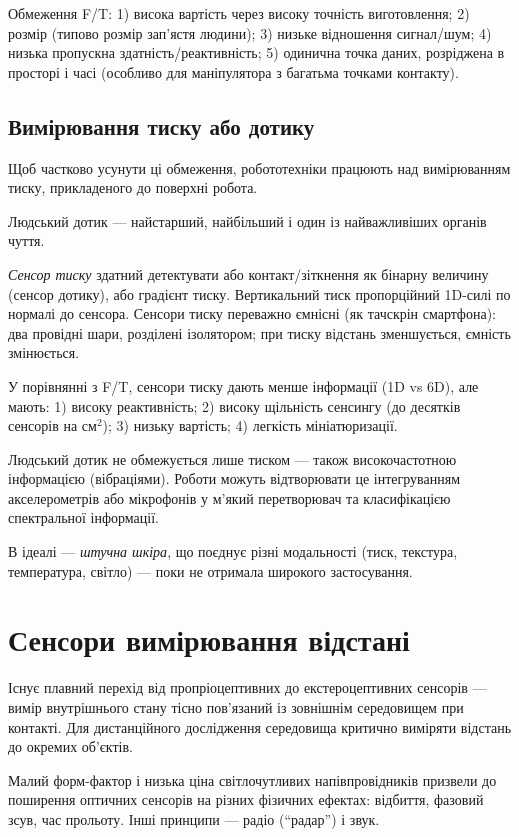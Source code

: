 Обмеження F/T: 1) висока вартість через високу точність виготовлення; 2) розмір (типово розмір зап'ястя людини); 3) низьке відношення сигнал/шум; 4) низька пропускна здатність/реактивність; 5) одинична точка даних, розріджена в просторі і часі (особливо для маніпулятора з багатьма точками контакту).

\subsection{Вимірювання тиску або дотику}
Щоб частково усунути ці обмеження, робототехніки працюють над вимірюванням тиску, прикладеного до поверхні робота.

Людський дотик — найстарший, найбільший і один із найважливіших органів чуття.

\emph{Сенсор тиску} здатний детектувати або контакт/зіткнення як бінарну величину (сенсор дотику), або градієнт тиску. Вертикальний тиск пропорційний 1D-силі по нормалі до сенсора. Сенсори тиску переважно ємнісні (як тачскрін смартфона): два провідні шари, розділені ізолятором; при тиску відстань зменшується, ємність змінюється.

У порівнянні з F/T, сенсори тиску дають менше інформації (1D vs 6D), але мають: 1) високу реактивність; 2) високу щільність сенсингу (до десятків сенсорів на см$^2$); 3) низьку вартість; 4) легкість мініатюризації.

Людський дотик не обмежується лише тиском — також високочастотною інформацією (вібраціями). Роботи можуть відтворювати це інтегруванням акселерометрів або мікрофонів у м'який перетворювач та класифікацією спектральної інформації.

В ідеалі — \emph{штучна шкіра}, що поєднує різні модальності (тиск, текстура, температура, світло) — поки не отримала широкого застосування.

\section{Сенсори вимірювання відстані}
Існує плавний перехід від пропріоцептивних до екстероцептивних сенсорів — вимір внутрішнього стану тісно пов'язаний із зовнішнім середовищем при контакті. Для дистанційного дослідження середовища критично виміряти відстань до окремих об'єктів.

Малий форм-фактор і низька ціна світлочутливих напівпровідників призвели до поширення оптичних сенсорів на різних фізичних ефектах: відбиття, фазовий зсув, час прольоту. Інші принципи — радіо (``радар'') і звук.


